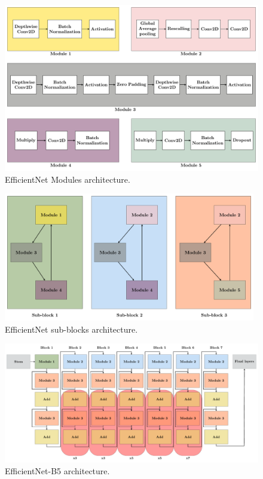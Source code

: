 \documentclass[12pt]{diazessay}
\newcounter{subsubsubsection}[subsubsection]
\begin{document}
    \begin{figure}[H]
        \centering
        \includegraphics[width=13cm]{Architectures figures/Modules.pdf}
        \caption[EfficientNet Modules architecture]{EfficientNet Modules architecture.}
    \end{figure}

    \begin{figure}[H]
        \centering
        \includegraphics[width=11cm]{Architectures figures/SubBlocks.pdf}
        \caption[EfficientNet SubBlocks architecture]{EfficientNet sub-blocks architecture.}
    \end{figure}
    
    
    \begin{figure}[H]
        \centering
        \includegraphics[width=16cm]{Architectures figures/EfficientNetB5.pdf}
        \caption[EfficientNetB5 architecture]{EfficientNet-B5 architecture.}
    \end{figure}
\end{document}
